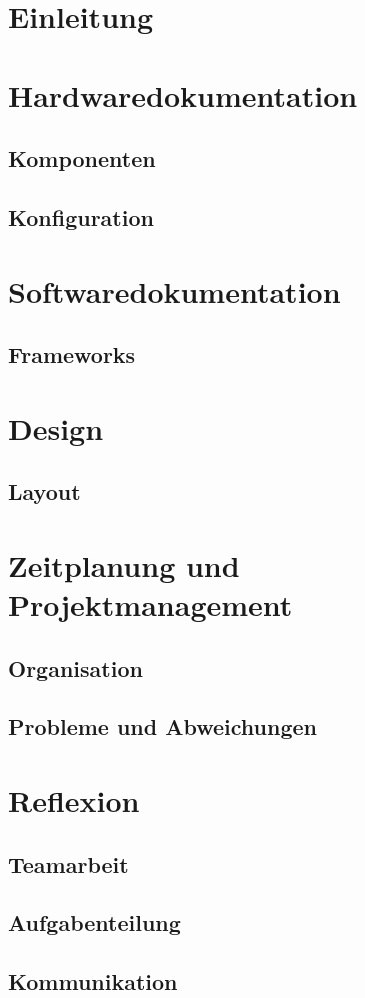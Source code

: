 \documentclass{itsys}
\begin{document}

\tableofcontents
\newpage


\section{Einleitung}

\newpage
\section{Hardwaredokumentation}
\subsection{Komponenten}
\subsection{Konfiguration}
\newpage
\section{Softwaredokumentation}
\subsection{Frameworks}

\newpage
\section{Design}
\subsection{Layout}

\newpage
\section{Zeitplanung und Projektmanagement}
\subsection{Organisation}
\subsection{Probleme und Abweichungen}
\newpage
\section{Reflexion}
\subsection{Teamarbeit}
\subsection{Aufgabenteilung}
\subsection{Kommunikation}


\end{document}
